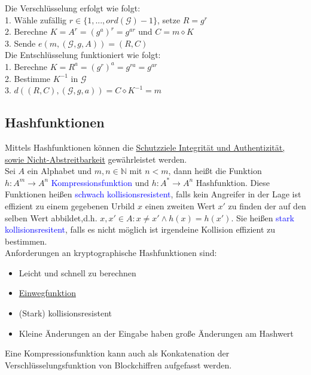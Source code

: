 \documentclass[a4paper,12pt]{article}
\newcommand{\blue}[1]{\textcolor{blue}{#1}}
\begin{document}
Die Verschlüsselung erfolgt wie folgt:\\
1. Wähle zufällig $r\in \{1,...,ord(\mathcal{G})-1\}$, setze $R = g^r$\\
2. Berechne $K=A^r=(g^a)^r=g^{ar}$ und $C=m\diamond K$\\
3. Sende $e(m,(\mathcal{G},g,A))=(R,C)$\\

Die Entschlüsselung funktioniert wie folgt:\\
1. Berechne $K=R^a=(g^r)^a=g^{ra}=g^{ar}$\\
2. Bestimme $K^{-1}$ in $\mathcal{G}$\\
3. $d((R,C),(\mathcal{G},g,a))=C\diamond K^{-1}=m$

\subsection{Hashfunktionen}
Mittels Hashfunktionen können die \hyperref[item:schutzziele]{Schutzziele Integrität und Authentizität, sowie Nicht-Abstreitbarkeit} gewährleistet werden.\\
Sei $A$ ein Alphabet und $m,n\in\mathbb{N}$ mit $n<m$, dann heißt die Funktion $h: A^m\rightarrow A^n$ \blue{Kompressionsfunktion} und $h: A^*\rightarrow A^n$ Hashfunktion. Diese Funktionen heißen \blue{schwach kollisionsresistent}, falls kein Angreifer in der Lage ist effizient zu einem gegebenen Urbild $x$ einen zweiten Wert $x'$ zu finden der auf den selben Wert abbildet,d.h. $x,x'\in A : x\neq x' \wedge h(x)=h(x')$. Sie heißen \blue{stark kollisionsresitent}, falls es nicht möglich ist irgendeine Kollision effizient zu bestimmen.\\
Anforderungen an kryptographische Hashfunktionen sind:
\begin{itemize}
\item Leicht und schnell zu berechnen
\item \hyperref[def:Einwegfunktion]{Einwegfunktion}
\item (Stark) kollisionsresistent
\item Kleine Änderungen an der Eingabe haben große Änderungen am Hashwert
\end{itemize}
Eine Kompressionsfunktion kann auch als Konkatenation der Verschlüsselungsfunktion von Blockchiffren aufgefasst werden.
\end{document}
